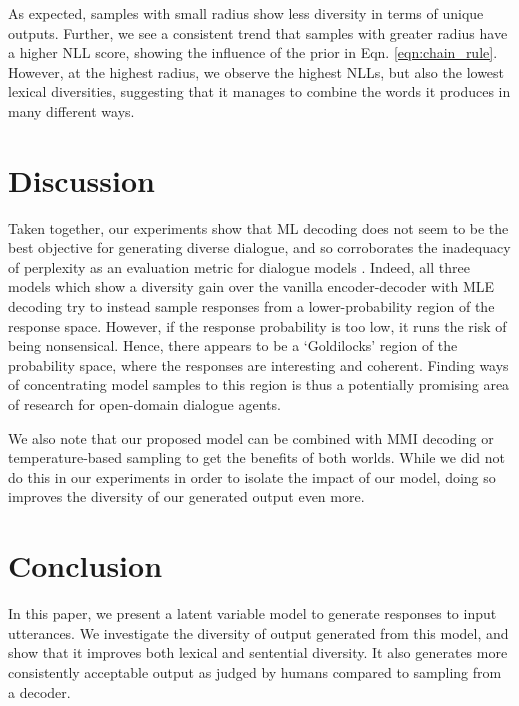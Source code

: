 As expected, samples with small radius show less diversity in terms of unique outputs. Further, we see a consistent trend that samples with greater radius have a higher NLL score, showing the influence of the prior in Eqn. \ref{eqn:chain_rule}. However, at the highest radius, we observe the highest NLLs, but also the lowest lexical diversities, suggesting that it manages to combine the words it produces in many different ways.

\section{Discussion}
\label{sec:discussion}
Taken together, our experiments show that ML decoding does not seem to be the best objective for generating diverse dialogue, and so corroborates the inadequacy of perplexity as an evaluation metric for dialogue models \citep{Liu:2016}. Indeed, all three models which show a diversity gain over the vanilla encoder-decoder with MLE decoding try to instead sample responses from a lower-probability region of the response space. However, if the response probability is too low, it runs the risk of being nonsensical. Hence, there appears to be a `Goldilocks' region of the probability space, where the responses are interesting and coherent. Finding ways of concentrating model samples to this region is thus a potentially promising area of research for open-domain dialogue agents.

We also note that our proposed model can be combined with MMI decoding or temperature-based sampling to get the benefits of both worlds. While we did not do this in our experiments in order to isolate the impact of our model, doing so improves the diversity of our generated output even more.

\section{Conclusion}
In this paper, we present a latent variable model to generate responses to input utterances. We investigate the diversity of output generated from this model, and show that it improves both lexical and sentential diversity. It also generates more consistently acceptable output as judged by humans compared to sampling from a decoder.
